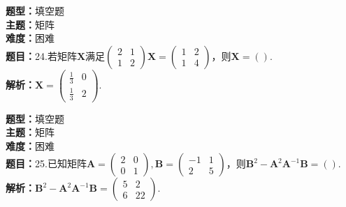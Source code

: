 \documentclass{ctexart}
\newenvironment{question}[5]{%
	\noindent\textbf{题型：}#1\\
	\textbf{主题：}#2\\
	\textbf{难度：}#3\\
	\textbf{题目：}#4\\
	\textbf{解析：}#5\\
	\vspace{1em}
}{}
\begin{document}
	\begin{question}
		{填空题}
		{矩阵}
		{困难}
		{24.若矩阵\(\mathbf{X}\)满足\(\left(\begin{array}{ll}2 & 1 \\ 1 & 2\end{array}\right)\mathbf{X}=\left(\begin{array}{ll}1 & 2 \\ 1 & 4\end{array}\right)\)，则\(\mathbf{X}=()\). }
		{\(\mathbf{X}=\left(\begin{array}{cc}\frac{1}{3} & 0 \\ \frac{1}{3} & 2\end{array}\right)\). }
	\end{question}
	
	\begin{question}
		{填空题}
		{矩阵}
		{困难}
		{25.已知矩阵\(\mathbf{A}=\left(\begin{array}{cc}2 & 0 \\ 0 & 1\end{array}\right),\mathbf{B}=\left(\begin{array}{cc}-1 & 1 \\ 2 & 5\end{array}\right)\)，则\(\mathbf{B}^2-\mathbf{A}^2\mathbf{A}^{-1}\mathbf{B}=()\). }
		{\(\mathbf{B}^2-\mathbf{A}^2\mathbf{A}^{-1}\mathbf{B}=\left(\begin{array}{cc}5 & 2 \\ 6 & 22\end{array}\right)\). }
	\end{question}
	
	
	
	
\end{document}
